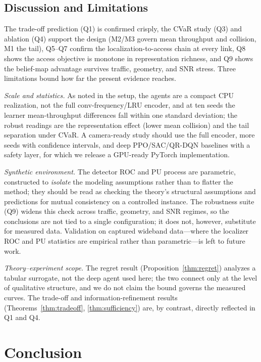 \documentclass[journal]{IEEEtran}
\begin{document}
\subsection{Discussion and Limitations}
\label{subsec:limitations}
The trade-off prediction (Q1) is confirmed crisply, the CVaR study (Q3) and
ablation (Q4) support the design (M2/M3 govern mean throughput and collision,
M1 the tail), Q5--Q7 confirm the localization-to-access chain at every link,
Q8 shows the access objective is monotone in representation richness, and Q9
shows the belief-map advantage survives traffic, geometry, and SNR stress.
Three limitations bound how far the present evidence reaches.

\emph{Scale and statistics.} As noted in the setup, the agents are a compact
CPU realization, not the full conv-frequency/LRU encoder, and at ten seeds the
learner mean-throughput differences fall within one standard deviation; the
robust readings are the representation effect (lower mean collision) and the
tail separation under CVaR. A camera-ready study should use the full encoder,
more seeds with confidence intervals, and deep PPO/SAC/QR-DQN baselines with a
safety layer, for which we release a GPU-ready PyTorch implementation.

\emph{Synthetic environment.} The detector ROC and PU process are parametric,
constructed to \emph{isolate} the modeling assumptions rather than to flatter
the method; they should be read as checking the theory's structural
assumptions and predictions for mutual consistency on a controlled instance.
The robustness suite (Q9) widens this check across traffic, geometry, and SNR
regimes, so the conclusions are not tied to a single configuration; it does
not, however, substitute for measured data. Validation on captured wideband
data---where the localizer ROC and PU statistics are empirical rather than
parametric---is left to future work.

\emph{Theory--experiment scope.} The regret result
(Proposition~\ref{thm:regret}) analyzes a tabular surrogate, not the deep agent
used here; the two connect only at the level of qualitative structure, and we
do not claim the bound governs the measured curves. The trade-off and
information-refinement results
(Theorems~\ref{thm:tradeoff}, \ref{thm:sufficiency}) are, by contrast,
directly reflected in Q1 and Q4.


\section{Conclusion}
\label{sec:conclusion}
\end{document}
